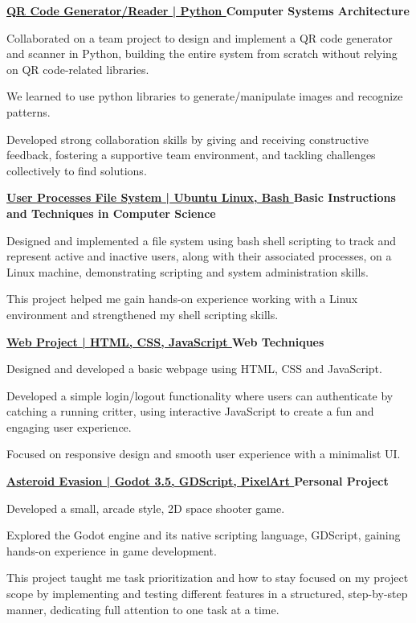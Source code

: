 \documentclass[letterpaper,10pt]{article}
\newcommand{\heading}[2]{
  \hspace{10pt}#1\hfill#2\\
}
\newcommand{\headingBf}[2]{
  \heading{\textbf{#1}}{\textbf{#2}}
}
\newenvironment{resume_list}{
  \vspace{-7pt}
  \begin{itemize}[itemsep=-2px, parsep=1pt, leftmargin=30pt]
}{
  \end{itemize}
}
\begin{document}
  \headingBf{\href{https://github.com/Alexandru-Morteanu/asc_pjct}{QR Code Generator/Reader | Python \faGithub}}{Computer Systems Architecture}
  \begin{resume_list}
    \item Collaborated on a team project to design and implement a QR code generator and scanner in Python, building the entire system from scratch without relying on QR code-related libraries.
    \item We learned to use python libraries to generate/manipulate images and recognize patterns.
    \item Developed strong collaboration skills by giving and receiving constructive feedback, fostering a supportive team environment, and tackling challenges collectively to find solutions.
  \end{resume_list}

  \headingBf{\href{https://github.com/denis0bej/UserFS}{User Processes File System | Ubuntu Linux, Bash \faGithub}}{Basic Instructions and Techniques in Computer Science}
  \begin{resume_list}
    \item Designed and implemented a file system using bash shell scripting to track and represent active and inactive users, along with their associated processes, on a Linux machine, demonstrating scripting and system administration skills.
    \item This project helped me gain hands-on experience working with a Linux environment and strengthened my shell scripting skills.
  \end{resume_list}

  \headingBf{\href{https://github.com/denis0bej/tw-project}{Web Project | HTML, CSS, JavaScript \faGithub}}{Web Techniques}
  \begin{resume_list}
    \item Designed and developed a basic webpage using HTML, CSS and JavaScript.
    \item Developed a simple login/logout functionality where users can authenticate by catching a running critter, using interactive JavaScript to create a fun and engaging user experience.
    \item Focused on responsive design and smooth user experience with a minimalist UI.
  \end{resume_list}
  \headingBf{\href{https://github.com/denis0bej/AsteroidEvasion}{Asteroid Evasion | Godot 3.5, GDScript, PixelArt \faGithub}}{Personal Project}
  \begin{resume_list}
    \item Developed a small, arcade style, 2D space shooter game. 
    \item Explored the Godot engine and its native scripting language, GDScript, gaining hands-on experience in game development.
    \item This project taught me task prioritization and how to stay focused on my project scope by implementing and testing different features in a structured, step-by-step manner, dedicating full attention to one task at a time.
  \end{resume_list}
\end{document}
